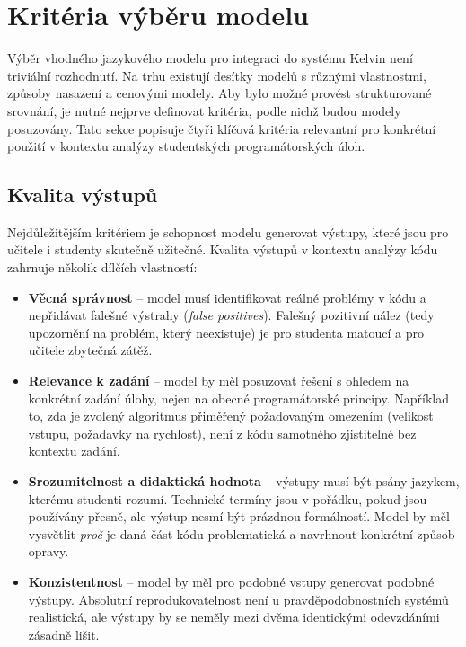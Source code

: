 \section{Kritéria výběru modelu}
\label{sec:selection-criteria}

Výběr vhodného jazykového modelu pro integraci do systému Kelvin není triviální rozhodnutí.
Na trhu existují desítky modelů s různými vlastnostmi, způsoby nasazení a cenovými modely.
Aby bylo možné provést strukturované srovnání, je nutné nejprve definovat kritéria, podle nichž budou modely posuzovány.
Tato sekce popisuje čtyři klíčová kritéria relevantní pro konkrétní použití v kontextu analýzy studentských programátorských úloh.

\subsection{Kvalita výstupů}
\label{subsec:criteria-quality}

Nejdůležitějším kritériem je schopnost modelu generovat výstupy, které jsou pro učitele i studenty skutečně užitečné.
Kvalita výstupů v kontextu analýzy kódu zahrnuje několik dílčích vlastností:

\begin{itemize}
    \item \textbf{Věcná správnost} -- model musí identifikovat reálné problémy v kódu a nepřidávat falešné výstrahy (\emph{false positives}).
    Falešný pozitivní nález (tedy upozornění na problém, který neexistuje) je pro studenta matoucí a pro učitele zbytečná zátěž.

    \item \textbf{Relevance k zadání} -- model by měl posuzovat řešení s ohledem na konkrétní zadání úlohy, nejen na obecné programátorské principy.
    Například to, zda je zvolený algoritmus přiměřený požadovaným omezením (velikost vstupu, požadavky na rychlost), není z kódu samotného zjistitelné bez kontextu zadání.

    \item \textbf{Srozumitelnost a didaktická hodnota} -- výstupy musí být psány jazykem, kterému studenti rozumí.
    Technické termíny jsou v pořádku, pokud jsou používány přesně, ale výstup nesmí být prázdnou formálností.
    Model by měl vysvětlit \emph{proč} je daná část kódu problematická a navrhnout konkrétní způsob opravy.

    \item \textbf{Konzistentnost} -- model by měl pro podobné vstupy generovat podobné výstupy.
    Absolutní reprodukovatelnost není u pravděpodobnostních systémů realistická, ale výstupy by se neměly mezi dvěma identickými odevzdáními zásadně lišit.
\end{itemize}

